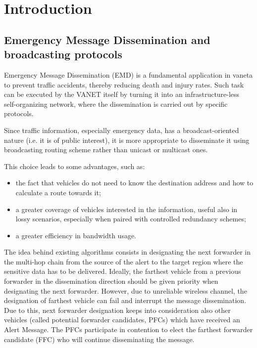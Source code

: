 
\chapter{Introduction}

	\section{Emergency Message Dissemination and broadcasting protocols}
		\label{sec:emd}
		Emergency Message Dissemination (EMD) is a fundamental application in \acrshort{vaneta} to prevent traffic accidents, thereby reducing death and injury rates. Such task can be executed by the VANET itself by turning it into an infrastructure-less self-organizing network, where the dissemination is carried out by specific protocols. 
		
		
		Since traffic information, especially emergency data, has a broadcast-oriented nature (i.e. it is of public interest), it is more appropriate to disseminate it using broadcasting routing scheme rather than unicast or multicast ones. \cite{5989903}
		
		This choice leads to some advantages, such as:
		\begin{itemize}
			\item the fact that vehicles do not need to know the destination address and how to calculate a route towards it;
			\item a greater coverage of vehicles interested in the information, useful also in lossy scenarios, especially when paired with controlled redundancy schemes;
			\item a greater efficiency in bandwidth usage.
		\end{itemize}
		
		The idea behind existing algorithms consists in designating the next forwarder in the multi-hop chain from the source of the alert to the target region where the sensitive data has to be delivered. Ideally, the farthest vehicle from a previous forwarder in the dissemination direction should be given priority when designating the next forwarder. However, due to unreliable wireless channel, the designation of farthest vehicle can fail and interrupt the message dissemination. Due to this, next forwarder designation keeps into consideration also other vehicles (called potential forwarder candidates, PFCs) which have received an Alert Message. The PFCs participate in contention to elect the farthest forwarder candidate (FFC) who will continue disseminating the message.
		
